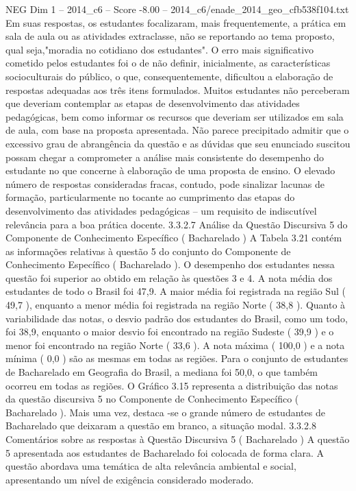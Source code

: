 \begin{textsample}{NEG Dim 1 – 2014\_c6 – Score -8.00 – 2014\_c6/enade\_2014\_geo\_cfb538f104.txt}
Em suas respostas, os estudantes focalizaram, mais frequentemente, a prática em sala de aula ou as atividades extraclasse, não se reportando ao tema proposto, qual seja,"moradia no cotidiano dos estudantes".
O erro mais significativo cometido pelos estudantes foi o de não definir, inicialmente, as características socioculturais do público, o que, consequentemente, dificultou a elaboração de respostas adequadas aos três itens formulados.
Muitos estudantes não perceberam que deveriam contemplar as etapas de desenvolvimento das atividades pedagógicas, bem como informar os recursos que deveriam ser utilizados em sala de aula, com base na proposta apresentada.
Não parece precipitado admitir que o excessivo grau de abrangência da questão e as dúvidas que seu enunciado suscitou possam chegar a comprometer a análise mais consistente do desempenho do estudante no que concerne à elaboração de uma proposta de ensino.
O elevado número de respostas consideradas fracas, contudo, pode sinalizar lacunas de formação, particularmente no tocante ao cumprimento das etapas do desenvolvimento das atividades pedagógicas – um requisito de indiscutível relevância para a boa prática docente. 3.3.2.7 Análise da Questão Discursiva 5 do Componente de Conhecimento Específico ( Bacharelado ) A Tabela 3.21 contém as informações relativas à questão 5 do conjunto do Componente de Conhecimento Específico ( Bacharelado ).
O desempenho dos estudantes nessa questão foi superior ao obtido em relação às questões 3 e 4.
A nota média dos estudantes de todo o Brasil foi 47,9.
A maior média foi registrada na região Sul ( 49,7 ), enquanto a menor média foi registrada na região Norte ( 38,8 ).
Quanto à variabilidade das notas, o desvio padrão dos estudantes do Brasil, como um todo, foi 38,9, enquanto o maior desvio foi encontrado na região Sudeste ( 39,9 ) e o menor foi encontrado na região Norte ( 33,6 ).
A nota máxima ( 100,0 ) e a nota mínima ( 0,0 ) são as mesmas em todas as regiões.
Para o conjunto de estudantes de Bacharelado em Geografia do Brasil, a mediana foi 50,0, o que também ocorreu em todas as regiões.
O Gráfico 3.15 representa a distribuição das notas da questão discursiva 5 no Componente de Conhecimento Específico ( Bacharelado ).
Mais uma vez, destaca -se o grande número de estudantes de Bacharelado que deixaram a questão em branco, a situação modal. 3.3.2.8 Comentários sobre as respostas à Questão Discursiva 5 ( Bacharelado ) A questão 5 apresentada aos estudantes de Bacharelado foi colocada de forma clara.
A questão abordava uma temática de alta relevância ambiental e social, apresentando um nível de exigência considerado moderado.

\end{textsample}
